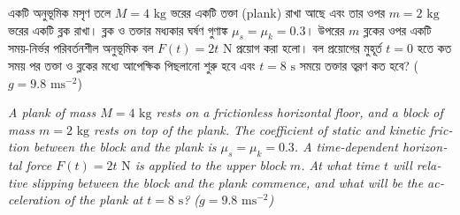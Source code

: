 \documentclass[12pt, a4paper]{article}
\begin{document}
\newpage

\newpage

\begin{tcolorbox}[questionbox={প্রশ্ন (Question) 39}]
    \noindent
    একটি অনুভূমিক মসৃণ তলে $M = 4\text{ kg}$ ভরের একটি তক্তা (plank) রাখা আছে এবং তার ওপর $m = 2\text{ kg}$ ভরের একটি ব্লক রাখা। ব্লক ও তক্তার মধ্যকার ঘর্ষণ গুণাঙ্ক $\mu_s = \mu_k = 0.3$। উপরের $m$ ব্লকের ওপর একটি সময়-নির্ভর পরিবর্তনশীল অনুভূমিক বল $F(t) = 2t\text{ N}$ প্রয়োগ করা হলো। বল প্রয়োগের মুহূর্ত $t = 0$ হতে কত সময় পর তক্তা ও ব্লকের মধ্যে আপেক্ষিক পিছলানো শুরু হবে এবং $t = 8\text{ s}$ সময়ে তক্তার ত্বরণ কত হবে? ($g = 9.8\text{ ms}^{-2}$)
    
    \vspace{0.8em}
    \begin{english}
    \noindent\textit{\color{darkgray}
    A plank of mass $M = 4\text{ kg}$ rests on a frictionless horizontal floor, and a block of mass $m = 2\text{ kg}$ rests on top of the plank. The coefficient of static and kinetic friction between the block and the plank is $\mu_s = \mu_k = 0.3$. A time-dependent horizontal force $F(t) = 2t\text{ N}$ is applied to the upper block $m$. At what time $t$ will relative slipping between the block and the plank commence, and what will be the acceleration of the plank at $t = 8\text{ s}$? ($g = 9.8\text{ ms}^{-2}$)
    }
    \end{english}
\end{tcolorbox}
\end{document}

